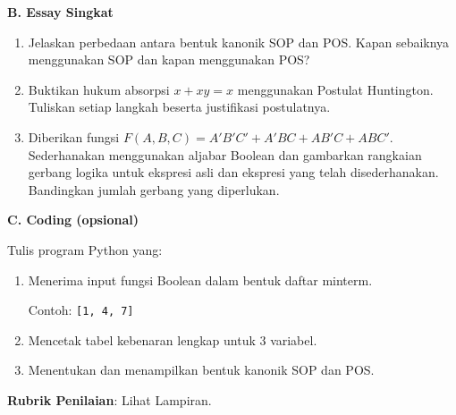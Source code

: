 \documentclass[../main]{subfiles}
\begin{document}
\begin{asesmen}
\textbf{B. Essay Singkat}
\begin{enumerate}
  \item Jelaskan perbedaan antara bentuk kanonik SOP dan POS. Kapan sebaiknya menggunakan SOP dan kapan menggunakan POS?
  \item Buktikan hukum absorpsi $x + xy = x$ menggunakan Postulat Huntington. Tuliskan setiap langkah beserta justifikasi postulatnya.
  \item Diberikan fungsi $F(A,B,C) = A'B'C' + A'BC + AB'C + ABC'$. Sederhanakan menggunakan aljabar Boolean dan gambarkan rangkaian gerbang logika untuk ekspresi asli dan ekspresi yang telah disederhanakan. Bandingkan jumlah gerbang yang diperlukan.
\end{enumerate}

\textbf{C. Coding (opsional)}

Tulis program Python yang:
\begin{enumerate}
  \item Menerima input fungsi Boolean dalam bentuk daftar minterm. \par
  Contoh: \texttt{[1, 4, 7]}
  \item Mencetak tabel kebenaran lengkap untuk 3 variabel.
  \item Menentukan dan menampilkan bentuk kanonik SOP dan POS.
\end{enumerate}

\textbf{Rubrik Penilaian}: Lihat Lampiran.
\end{asesmen}

\end{document}
